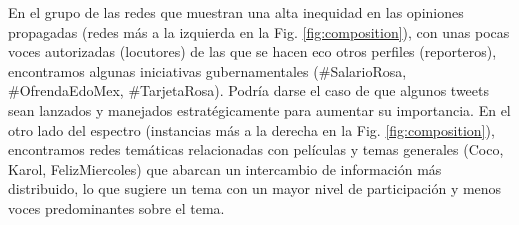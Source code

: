 En el grupo de las redes que muestran una alta inequidad en las opiniones propagadas (redes más a la izquierda en la Fig. \ref{fig:composition}), con unas pocas voces autorizadas (locutores) de las que se hacen eco otros perfiles (reporteros), encontramos algunas iniciativas gubernamentales (\#SalarioRosa, \#OfrendaEdoMex, \#TarjetaRosa). Podría darse el caso de que algunos tweets sean lanzados y manejados estratégicamente para aumentar su importancia. En el otro lado del espectro (instancias más a la derecha en la Fig. \ref{fig:composition}), encontramos redes temáticas relacionadas con películas y temas generales (Coco, Karol, FelizMiercoles) que abarcan un intercambio de información más distribuido, lo que sugiere un tema con un mayor nivel de participación y menos voces predominantes sobre el tema. 


